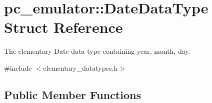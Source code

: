 \hypertarget{structpc__emulator_1_1DateDataType}{}\section{pc\+\_\+emulator\+:\+:Date\+Data\+Type Struct Reference}
\label{structpc__emulator_1_1DateDataType}


The elementary Date data type containing year, month, day.  




{\ttfamily \#include $<$elementary\+\_\+datatypes.\+h$>$}

\subsection*{Public Member Functions}
